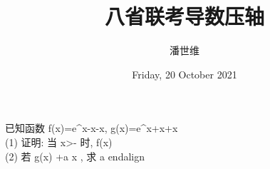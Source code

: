 \documentclass[a4paper,12pt]{article}
\begin{document}
\title {八省联考导数压轴}
\author{潘世维}
\date{Friday, 20 October 2021}
\maketitle


已知函数  f(x)=e^{x}-\sin x-\cos x, g(x)=e^{x}+\sin x+\cos x\\
(1) 证明: 当  x>-  时,  f(x)  \\
(2) 若  g(x) +a x , 求  a 
end{align}
\end{document}
